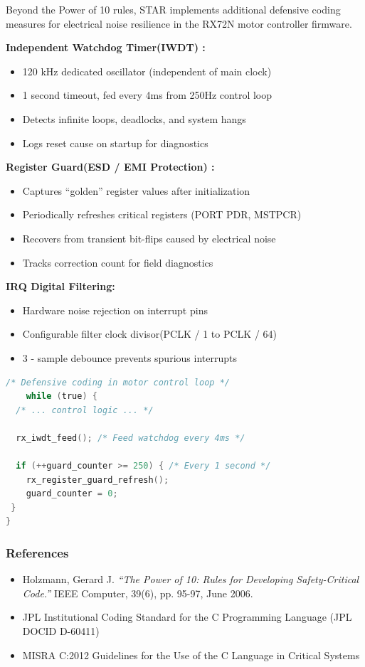Beyond the Power of 10 rules, STAR implements additional defensive coding measures for electrical noise resilience in the RX72N motor controller firmware.

\textbf{Independent Watchdog Timer(IWDT) :
}
\begin{itemize}
\item 120 kHz dedicated oscillator (independent of main clock)
\item 1 second timeout, fed every 4ms from 250Hz control loop
\item Detects infinite loops, deadlocks, and system hangs
\item Logs reset cause on startup for diagnostics
\end{itemize}

\textbf{Register Guard(ESD / EMI Protection) :}
\begin{itemize}
\item Captures ``golden'' register values after initialization
\item Periodically refreshes critical registers (PORT PDR, MSTPCR)
\item Recovers from transient bit-flips caused by electrical noise
\item Tracks correction count for field diagnostics
\end{itemize}

\textbf{IRQ Digital Filtering:}
\begin{itemize}
\item Hardware noise rejection on interrupt pins
\item Configurable filter clock divisor(PCLK / 1 to PCLK / 64)
\item 3 - sample debounce prevents spurious interrupts
\end{itemize}

\begin{lstlisting}[language = C]
    /* Defensive coding in motor control loop */
    while (true) {
  /* ... control logic ... */

  rx_iwdt_feed(); /* Feed watchdog every 4ms */

  if (++guard_counter >= 250) { /* Every 1 second */
    rx_register_guard_refresh();
    guard_counter = 0;
 }
}
\end{lstlisting}

\subsubsection{References}

\begin{itemize}
\item Holzmann, Gerard J. \textit {``The Power of 10: Rules for Developing Safety-Critical Code.''
} IEEE Computer, 39(6), pp. 95-97, June 2006.
\item JPL Institutional Coding Standard for the C Programming Language (JPL DOCID D-60411)
\item MISRA C:2012 Guidelines for the Use of the C Language in Critical Systems
\end{itemize}
